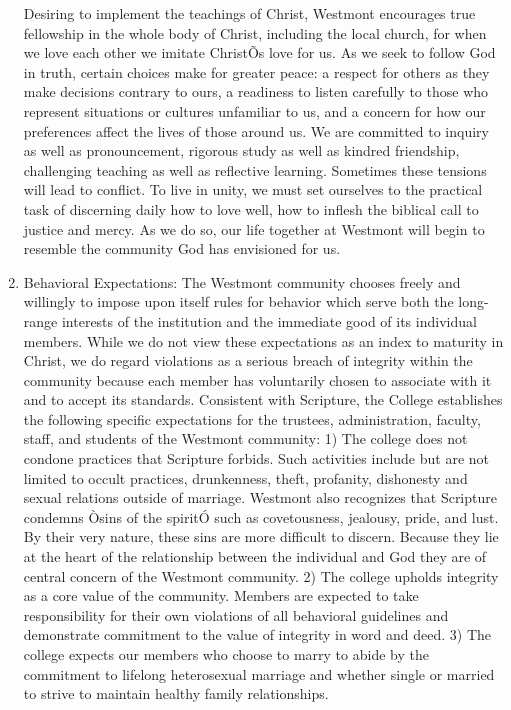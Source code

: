 \documentclass[letterpaper, 11pt]{article}
\begin{document}
\begin{enumerate}[label=\alph*)]
					Desiring to implement the teachings of Christ, Westmont encourages true fellowship in the whole body of Christ, including the local church, for when we love each other we imitate ChristÕs love for us.  As we seek to follow God in truth, certain choices make for greater peace:  a respect for others as they make decisions contrary to ours, a readiness to listen carefully to those who represent situations or cultures unfamiliar to us, and a concern for how our preferences affect the lives of those around us.
					We are committed to inquiry as well as pronouncement, rigorous study as well as kindred friendship, challenging teaching as well as reflective learning.   Sometimes these tensions will lead to conflict.  To live in unity, we must set ourselves to the practical task of discerning daily how to love well, how to inflesh the biblical call to justice and mercy.  As we do so, our life together at Westmont will begin to resemble the community God has envisioned for us.
					\item{Behavioral Expectations:}
					The Westmont community chooses freely and willingly to impose upon itself rules for behavior which serve both the long-range interests of the institution and the immediate good of its individual members.  While we do not view these expectations as an index to maturity in Christ, we do regard violations as a serious breach of integrity within the community because each member has voluntarily chosen to associate with it and to accept its standards.
					Consistent with Scripture, the College establishes the following specific expectations for the trustees, administration, faculty, staff, and students of the Westmont community:
					1) The college does not condone practices that Scripture forbids.  Such activities include but are not limited to occult practices, drunkenness, theft, profanity, dishonesty and sexual relations outside of marriage.  Westmont also recognizes that Scripture condemns Òsins of the spiritÓ such as covetousness, jealousy, pride, and lust.  By their very nature, these sins are more difficult to discern.  Because they lie at the heart of the relationship between the individual and God they are of central concern of the Westmont community.
					2) The college upholds integrity as a core value of the community.  Members are expected to take responsibility for their own violations of all behavioral guidelines and demonstrate commitment to the value of integrity in word and deed.
					3) The college expects our members who choose to marry to abide by the commitment to lifelong heterosexual marriage and whether single or married to strive to maintain healthy family relationships.

\end{enumerate}
\end{document}
